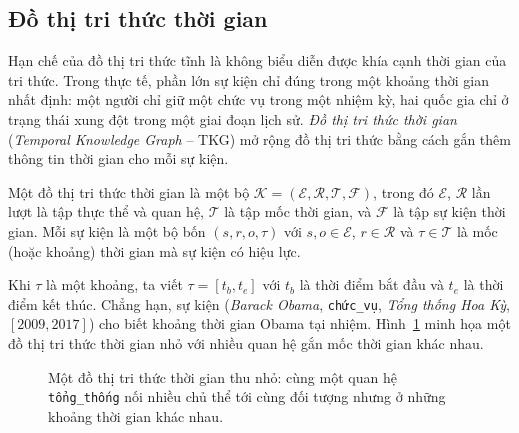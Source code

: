 \subsection{Đồ thị tri thức thời gian}

Hạn chế của đồ thị tri thức tĩnh là không biểu diễn được khía cạnh thời gian của tri thức. Trong
thực tế, phần lớn sự kiện chỉ đúng trong một khoảng thời gian nhất định: một người chỉ giữ một
chức vụ trong một nhiệm kỳ, hai quốc gia chỉ ở trạng thái xung đột trong một giai đoạn lịch sử.
\textit{Đồ thị tri thức thời gian} (\textit{Temporal Knowledge Graph} -- TKG) mở rộng đồ thị tri
thức bằng cách gắn thêm thông tin thời gian cho mỗi sự kiện.

\begin{definition}
Một đồ thị tri thức thời gian là một bộ $\mathcal{K} = (\mathcal{E}, \mathcal{R}, \mathcal{T},
\mathcal{F})$, trong đó $\mathcal{E}$, $\mathcal{R}$ lần lượt là tập thực thể và quan hệ,
$\mathcal{T}$ là tập mốc thời gian, và $\mathcal{F}$ là tập sự kiện thời gian. Mỗi sự kiện là một
bộ bốn $(s, r, o, \tau)$ với $s, o \in \mathcal{E}$, $r \in \mathcal{R}$ và $\tau \in \mathcal{T}$
là mốc (hoặc khoảng) thời gian mà sự kiện có hiệu lực.
\end{definition}

Khi $\tau$ là một khoảng, ta viết $\tau = [t_{b}, t_{e}]$ với $t_{b}$ là thời điểm bắt đầu và
$t_{e}$ là thời điểm kết thúc. Chẳng hạn, sự kiện (\textit{Barack Obama}, \texttt{chức\_vụ},
\textit{Tổng thống Hoa Kỳ}, $[2009, 2017]$) cho biết khoảng thời gian Obama tại nhiệm.
Hình~\ref{fig:tkg-example} minh họa một đồ thị tri thức thời gian nhỏ với nhiều quan hệ gắn mốc
thời gian khác nhau.

\begin{figure}[ht]
  \centering
  \caption{Một đồ thị tri thức thời gian thu nhỏ: cùng một quan hệ
  \texttt{tổng\_thống} nối nhiều chủ thể tới cùng đối tượng nhưng ở những khoảng thời gian khác
  nhau. }
  \label{fig:tkg-example}
\end{figure}

